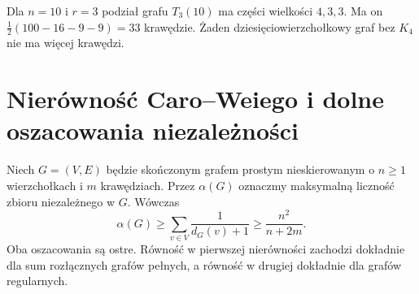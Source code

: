 \begin{przyklad}[Zakaz $K_4$]
\label{ex:tg-turan-ten}
Dla $n=10$ i $r=3$ podział grafu
$T_3(10)$ ma części wielkości $4,3,3$.
Ma on $\tfrac12(100-16-9-9)=33$ krawędzie.
Żaden dziesięciowierzchołkowy graf bez $K_4$
nie ma więcej krawędzi.
\end{przyklad}

\section{Nierówność Caro--Weiego i dolne oszacowania niezależności}
\label{sec:tg-caro-wei}

\begin{twierdzenie}
\label{thm:tg-caro-wei}
Niech $G=(V,E)$ będzie skończonym
grafem prostym nieskierowanym o $n\geq1$
wierzchołkach i $m$ krawędziach.
Przez $\alpha(G)$ oznaczmy maksymalną
liczność zbioru niezależnego w $G$.
Wówczas
\[
\alpha(G)\geq
\sum_{v\in V}\frac{1}{d_G(v)+1}
\geq\frac{n^2}{n+2m}.
\]
Oba oszacowania są ostre. Równość
w pierwszej nierówności zachodzi
dokładnie dla sum rozłącznych grafów pełnych,
a równość w drugiej dokładnie dla grafów regularnych.
\end{twierdzenie}
